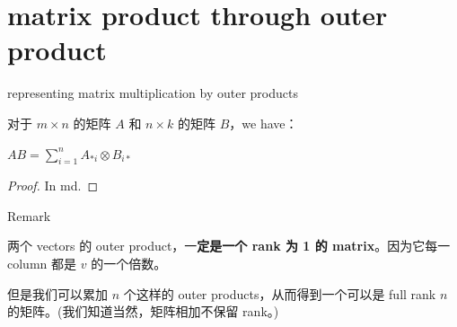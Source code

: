 \section{matrix product through outer product}

\begin{theorem}{representing matrix multiplication by outer products}

对于 \(m \times n\) 的矩阵 \(A\) 和 \(n \times k\) 的矩阵 \(B\)，we have：

\(AB = \sum_{i = 1}^{n}A_{\ast i} \otimes B_{i \ast}\)

\end{theorem}

\begin{proof}

In md.

\end{proof}

\begin{qlremark}{Remark}

两个 vectors 的 outer product，一\textbf{定是一个 rank 为 1 的 matrix}。因为它每一 column 都是 \(v\) 的一个倍数。

但是我们可以累加 \(n\) 个这样的 outer products，从而得到一个可以是 full rank \(n\) 的矩阵。(我们知道当然，矩阵相加不保留 rank。)

\end{qlremark}
